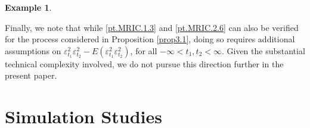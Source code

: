\documentclass[ejsv2]{imsart}
\theoremstyle{plain}
\theoremstyle{definition}
\newtheorem{example}{Example}[section]
\theoremstyle{remark}
\begin{document}
\begin{example}
\end{example}
Finally, we note that while \eqref{pt.MRIC.1.3} and \eqref{pt.MRIC.2.6} can also be verified for the process considered in Proposition \ref{prop3.1}, doing so requires additional assumptions on
$\varepsilon_{t_1}^2\varepsilon_{t_2}^2 - E(\varepsilon_{t_1}^2\varepsilon_{t_2}^2)$,
for all $-\infty < t_1, t_2 < \infty$. Given the substantial technical complexity involved, we do not pursue this direction further in the present paper.








\section{Simulation Studies}\label{sec:4}
\end{document}
